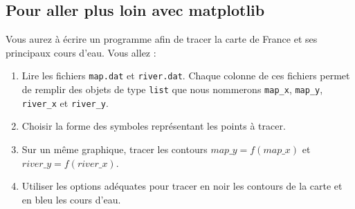 \subsection{Pour aller plus loin avec matplotlib {\sc [Facultatif]}}

Vous aurez à écrire un programme afin  de tracer la carte de France et
ses principaux cours d'eau.  Vous allez :

\begin{enumerate}
\item Lire les fichiers \texttt{map.dat} et \texttt{river.dat}. Chaque
  colonne  de  ces fichiers  permet  de  remplir  des objets  de  type
  \texttt{list} que  nous nommerons  \texttt{map\_x}, \texttt{map\_y},
  \texttt{river\_x} et \texttt{river\_y}.
\item Choisir la forme des symboles représentant les points à tracer.

\item Sur un même graphique,  tracer les contours $map\_y = f(map\_x)$
  et $river\_y = f(river\_x)$.

\item Utiliser les options adéquates  pour tracer en noir les contours
  de la carte et en bleu les cours d'eau.


\end{enumerate}




\vfill
